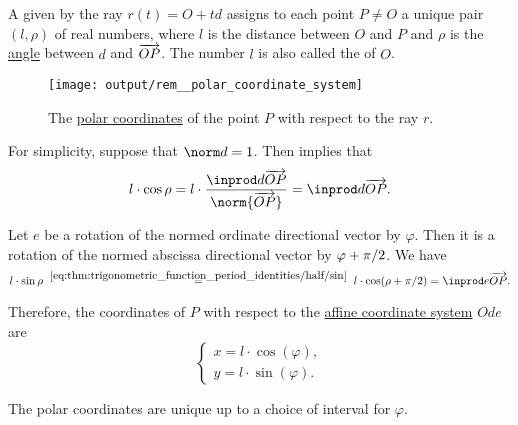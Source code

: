 \begin{remark}\label{rem:polar_coordinate_system}
  A  given by the ray \( r(t) = O + td \) assigns to each point \( P \neq O \) a unique pair \( (l, \rho) \) of real numbers, where \( l \) is the distance between \( O \) and \( P \) and \( \rho \) is the \hyperref[def:angle]{angle} between \( d \) and \( \overrightarrow{OP} \). The number \( l \) is also called the  of \( O \).

  \begin{figure}[!ht]
    \centering
    \texttt{[image: output/rem\_\_polar\_coordinate\_system]}
    \caption{The \hyperref[rem:polar_coordinate_system]{polar coordinates} of the point \( P \) with respect to the ray \( r \).}\label{fig:rem:polar_coordinate_system}
  \end{figure}

  For simplicity, suppose that \( \norm d = 1 \). Then  implies that
  \begin{equation*}
    l \cdot \cos \rho = l \cdot \frac {\inprod d {\vect{OP}}} {\norm{\vect{OP}}} = \inprod d {\vect{OP}}.
  \end{equation*}

  Let \( e \) be a rotation of the normed ordinate directional vector by \( \varphi \). Then it is a rotation of the normed abscissa directional vector by \( \varphi + \ifrac \pi 2 \). We have
  \begin{equation*}
    l \cdot \sin \rho
    \reloset {\eqref{eq:thm:trigonometric_function_period_identities/half/sin}} =
    l \cdot \cos(\rho + \ifrac \pi 2)
    =
    \inprod e {\vect{OP}}.
  \end{equation*}

  Therefore, the coordinates of \( P \) with respect to the \hyperref[def:affine_coordinate_system]{affine coordinate system} \( Ode \) are
  \begin{equation}\label{eq:rem:polar_coordinate_system/simple}
    \begin{cases}
      x = l \cdot \cos(\varphi), \\
      y = l \cdot \sin(\varphi).
    \end{cases}
  \end{equation}

  The polar coordinates are unique up to a choice of interval for \( \varphi \).
\end{remark}

